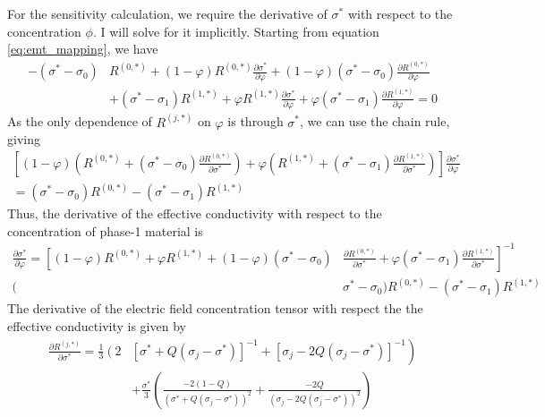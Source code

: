 For the sensitivity calculation, we require the derivative of $\sigma^*$ with respect to the concentration $\phi$. I will solve for it implicitly. Starting from equation \ref{eq:emt_mapping}, we have
\begin{displaymath}
\begin{split}
    - (\sigma^* - \sigma_0)& R^{(0,*)}
    + (1-\varphi)R^{(0,*)}\frac{\partial \sigma^*}{\partial \varphi}
    + (1-\varphi)(\sigma^* - \sigma_0)\frac{\partial R^{(0,*)}}{\partial \varphi} \\
    & + (\sigma^* - \sigma_1)R^{(1,*)}
    + \varphi R^{(1,*)} \frac{\partial \sigma^*}{\partial \varphi}
    + \varphi(\sigma^* - \sigma_1)\frac{\partial R^{(1,*)}}{\partial \varphi}
    = 0
\end{split}
\end{displaymath}
As the only dependence of $R^{(j,*)}$ on $\varphi$ is through $\sigma^*$, we can use the chain rule, giving
\begin{displaymath}
\begin{split}
    \left[
    (1-\varphi)\left(
        R^{(0,*)} + (\sigma^* - \sigma_0)\frac{\partial R^{(0,*)}}{\partial \sigma^*}
    \right) + \varphi \left(
        R^{(1,*)}  + (\sigma^* - \sigma_1)\frac{\partial R^{(1,*)}}{\partial \sigma^*}
    \right)
    \right]
    \frac{\partial \sigma^*}{\partial \varphi}
    \\  = (\sigma^* - \sigma_0)  R^{(0,*)}  - (\sigma^* - \sigma_1)R^{(1,*)}
\end{split}
\end{displaymath}
Thus, the derivative of the effective conductivity with respect to the concentration of phase-1 material is
\begin{equation}
\begin{split}
    \frac{\partial \sigma^*}{\partial \varphi}
    =
    \left[
    (1-\varphi)R^{(0,*)} + \varphi R^{(1,*)}
    + (1-\varphi)(\sigma^* - \sigma_0)\right.&\left.\frac{\partial R^{(0,*)}}{\partial \sigma^*}
    + \varphi(\sigma^* - \sigma_1)\frac{\partial R^{(1,*)}}{\partial \sigma^*}
    \right]^{-1} \\
    (&\sigma^* - \sigma_0)R^{(0,*)}  - (\sigma^* - \sigma_1)R^{(1,*)}
\end{split}
\end{equation}
The derivative of the electric field concentration tensor with respect the the effective conductivity is given by
\begin{equation}
\begin{split}
\frac{\partial R^{(j, *)}}{{\partial \sigma^*}} =
\frac{1}{3}\left( 2\right.&\left.[\sigma^* + Q(\sigma_j - \sigma^*) ]^{-1} + [\sigma_j - 2Q(\sigma_j - \sigma^*)]^{-1}\right)
\\ &+ \frac{\sigma^*}{3}\left(
\frac{-2(1 - Q)}{(\sigma^* + Q(\sigma_j - \sigma^*))^2} + \frac{-2Q}{(\sigma_j - 2Q(\sigma_j - \sigma^*))^2}
\right)
\end{split}
\end{equation}

